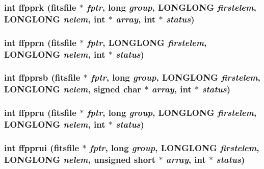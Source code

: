 \subsubsection{\setlength{\rightskip}{0pt plus 5cm}int ffpprk (\bf{fitsfile} $\ast$ {\em fptr}, long {\em group}, \bf{LONGLONG} {\em firstelem}, \bf{LONGLONG} {\em nelem}, int $\ast$ {\em array}, int $\ast$ {\em status})}\label{fitsio_8h_be4634cb3ee2982397aeb333881b4cb3}


\subsubsection{\setlength{\rightskip}{0pt plus 5cm}int ffpprn (\bf{fitsfile} $\ast$ {\em fptr}, \bf{LONGLONG} {\em firstelem}, \bf{LONGLONG} {\em nelem}, int $\ast$ {\em status})}\label{fitsio_8h_f6ed92f80030d4357b922361ee885fd8}


\subsubsection{\setlength{\rightskip}{0pt plus 5cm}int ffpprsb (\bf{fitsfile} $\ast$ {\em fptr}, long {\em group}, \bf{LONGLONG} {\em firstelem}, \bf{LONGLONG} {\em nelem}, signed char $\ast$ {\em array}, int $\ast$ {\em status})}\label{fitsio_8h_423d9ab6b05cb4a468f07ce5a7314597}


\subsubsection{\setlength{\rightskip}{0pt plus 5cm}int ffppru (\bf{fitsfile} $\ast$ {\em fptr}, long {\em group}, \bf{LONGLONG} {\em firstelem}, \bf{LONGLONG} {\em nelem}, int $\ast$ {\em status})}\label{fitsio_8h_02bd28787c00e22132867eab898e1632}


\subsubsection{\setlength{\rightskip}{0pt plus 5cm}int ffpprui (\bf{fitsfile} $\ast$ {\em fptr}, long {\em group}, \bf{LONGLONG} {\em firstelem}, \bf{LONGLONG} {\em nelem}, unsigned short $\ast$ {\em array}, int $\ast$ {\em status})}\label{fitsio_8h_bf984c3beeeb97131a4237a5ff8fb344}


